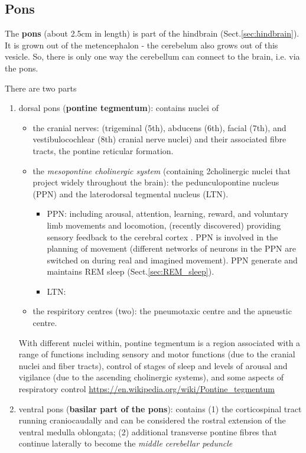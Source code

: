     


\subsection{Pons}
\label{sec:pons}

The {\bf pons} (about 2.5cm in length) is part of the hindbrain
(Sect.\ref{sec:hindbrain}). It is grown out of the metencephalon - the
cerebelum also grows out of this vesicle. So, there is only one way the
cerebellum can connect to the brain, i.e. via the pons.

There are two parts
\begin{enumerate}

  \item dorsal pons ({\bf pontine tegmentum}):  contains nuclei of 
  \begin{itemize}
     \item the cranial nerves: (trigeminal (5th), abducens (6th), facial (7th),
    and vestibulocochlear (8th) cranial nerve nuclei) and their 
    associated fibre tracts, the pontine reticular formation. 
  
     \item the {\it mesopontine cholinergic system} (containing 2cholinergic
     nuclei that project widely throughout the brain): the pedunculopontine
     nucleus (PPN) and the laterodorsal tegmental nucleus (LTN).
     \begin{itemize}
       \item PPN:  including arousal, attention, learning, reward, and voluntary
       limb movements and locomotion, (recently discovered) providing sensory
       feedback to the cerebral cortex \citep{tsang2010}.
       PPN is involved in the planning of movement (different
       networks of neurons in the PPN are switched on during real and imagined
       movement).
       PPN generate and maintains REM sleep (Sect.\ref{sec:REM_sleep}).
       
       
       \item LTN: 
     \end{itemize}
  
     \item the respiritory centres (two): the pneumotaxic centre and the
     apneustic centre.
     
  \end{itemize}

With different nuclei within, pontine tegmentum is a region associated with a
range of functions including sensory and motor functions (due to the cranial
nuclei and fiber tracts), control of stages of sleep and levels of arousal and
vigilance (due to the ascending cholinergic systems), and some aspects of
respiratory control
\url{https://en.wikipedia.org/wiki/Pontine_tegmentum}
  
  \item ventral pons ({\bf basilar part of the pons}): contains (1) the
  corticospinal tract running craniocaudally and can be considered the rostral
  extension of the ventral medulla oblongata; (2)
  additional transverse pontine fibres that continue laterally to
  become the {\it middle cerebellar peduncle} 
  
\end{enumerate}
 

